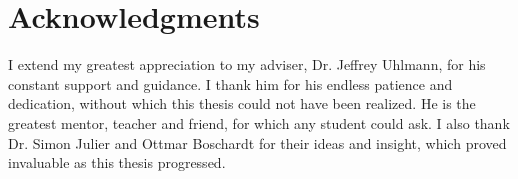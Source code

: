\section*{\centering Acknowledgments}
\hspace{15pt} I extend my greatest appreciation to my adviser, Dr. Jeffrey Uhlmann, for his constant support and
guidance. I thank him for his endless patience and dedication, without which this thesis could not have been realized.
He is the greatest mentor, teacher and friend, for which any student could ask. I also thank Dr. Simon Julier and Ottmar
Boschardt for their ideas and insight, which proved invaluable as this thesis progressed.
       
